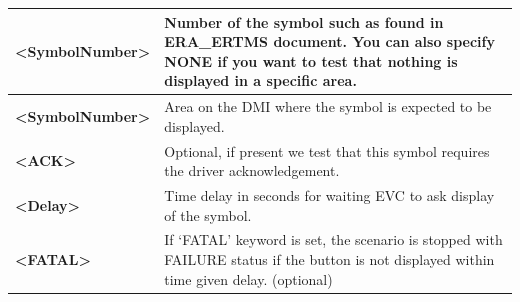 \documentclass{template/openetcs}
\begin{document}
\begin{itemize}
\begin{longtable}{|l|l|}
				\hline
				
					\begin{minipage}[t]{0.22\linewidth} \textbf{<SymbolNumber>}	\end{minipage}
				&	\begin{minipage}[t]{0.78\linewidth} Number of the symbol such as found in ERA\_ERTMS document. You can also specify NONE if you want to test that nothing is displayed in a specific area. \end{minipage} \\ \hline
				
					\begin{minipage}[t]{0.22\linewidth} \textbf{<SymbolNumber>} \end{minipage}
				&	\begin{minipage}[t]{0.78\linewidth} Area on the DMI where the symbol is expected to be displayed.\end{minipage} \\
				
				\hline
				
					\begin{minipage}[t]{0.22\linewidth} \textbf{<ACK>} \end{minipage}
				&	\begin{minipage}[t]{0.78\linewidth} Optional, if present we test that this symbol requires the driver acknowledgement. \end{minipage} \\
				
				\hline
								
					\begin{minipage}[t]{0.22\linewidth} \textbf{<Delay>} \end{minipage}
				&	\begin{minipage}[t]{0.78\linewidth} Time delay in seconds for waiting EVC to ask display of the symbol. \end{minipage} \\
				
				\hline
				
					\begin{minipage}[t]{0.22\linewidth} \textbf{<FATAL>} \end{minipage}
				&	\begin{minipage}[t]{0.78\linewidth} If ‘FATAL’ keyword is set, the scenario is stopped with FAILURE status if the button is not displayed within time given delay. (optional) \end{minipage} \\
				

\end{longtable}
\end{itemize}
\end{document}
